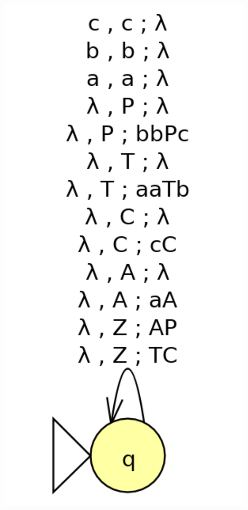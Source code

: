 \documentclass[a4paper,11pt]{article}
\begin{document}
\begin{enumerate}
    \includegraphics[scale=0.5]{Lez8solLast.png}
\end{enumerate}
\end{document}
